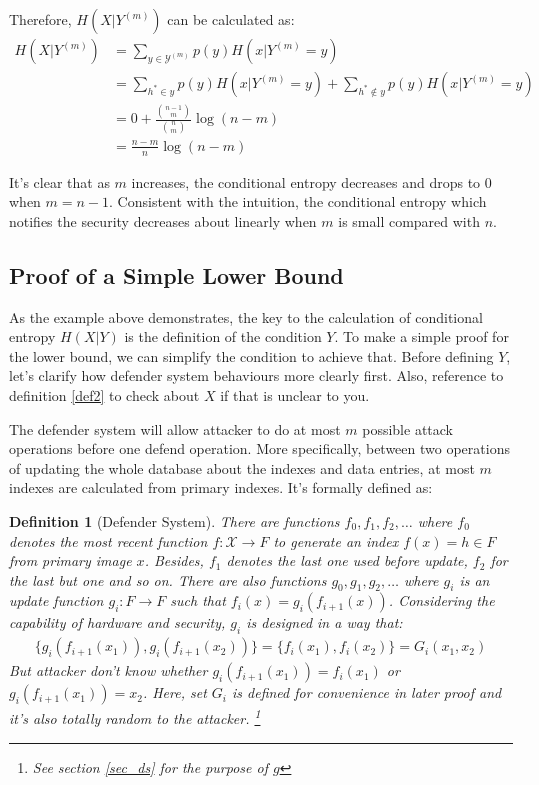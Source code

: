 \documentclass[10pt,a4paper]{article}
\newtheorem{mydef}{Definition}
\begin{document}
		Therefore, $H(X | Y^{(m)})$ can be calculated as:
		\begin{align*}
			H(X | Y^{(m)}) &= \sum_{y \in \mathcal Y^{(m)}} p(y) H(x | Y^{(m)} = y)\\
				&= \sum_{h^* \in y} p(y) H(x | Y^{(m)} = y) + \sum_{h^* \notin y} p(y) H(x | Y^{(m)} = y)\\
				&= 0+\frac{\binom{n-1}{m}}{\binom{n}{m}} \log(n-m)\\
				&= \frac{n-m}{n} \log(n-m)
		\end{align*}
		
		It's clear that as $m$ increases, 
		the conditional entropy decreases and drops to $0$ when $m = n-1$. 
		Consistent with the intuition, the conditional
		entropy which notifies the security decreases about linearly when $m$ is small 
		compared with $n$.
		
	\subsection{Proof of a Simple Lower Bound}
		As the example above demonstrates, the key to the calculation
		of conditional entropy $H(X|Y)$ is the definition of the condition $Y$.
		To make a simple proof for the lower bound, we can simplify the
		condition to achieve that. Before defining $Y$, let's
		clarify how defender system behaviours more clearly first. Also, reference
		to definition \ref{def2} to check about $X$ if that is unclear to you.
		
		The defender system will allow attacker to do at most $m$ possible
		attack operations before one defend operation. More specifically, between
		two operations of updating the whole database about the indexes and data entries,
		at most $m$ indexes are calculated from primary indexes. It's formally defined
		as:
		\begin{mydef}[Defender System]
			There are functions $f_0, f_1, f_2, \ldots$ where
			$f_0$ denotes the most recent function $f: \mathcal{X} \rightarrow F$
			to generate an index $f(x) = h \in F$ from primary image $x$. 
			Besides, $f_1$ denotes the last one used before update, $f_2$ for the last but one and so on.
			There are also functions $g_0, g_1, g_2, \ldots$ where
			$g_i$ is an update function $g_i: F \rightarrow F$ such that
			$f_i(x) = g_i(f_{i+1}(x))$. Considering the capability of hardware and security,
			$g_i$ is designed in a way that:
			\begin{align*}
				\{g_i(f_{i+1}(x_1)), g_i(f_{i+1}(x_2))\} = \{ f_i(x_1), f_i(x_2)\} = G_i(x_1, x_2)
			\end{align*}
			But attacker don't know whether $g_i(f_{i+1}(x_1)) = f_i(x_1)$ or
			$g_i(f_{i+1}(x_1)) = x_2$. 
			Here, set $G_i$ is defined for convenience in later proof and
			it's also totally random
			to the attacker. \footnote{See section \ref{sec_ds} for the purpose
			of $g$}
		\end{mydef}
		
\end{document}
